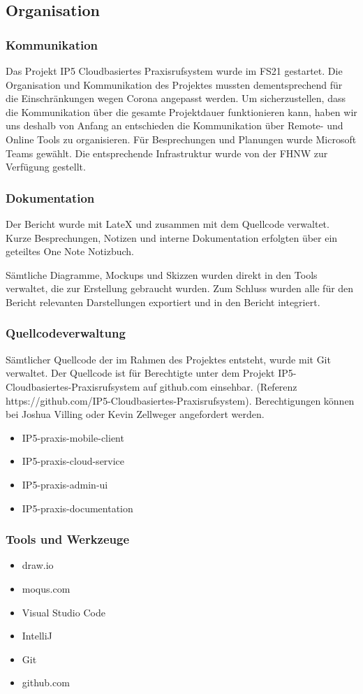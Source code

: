 \clearpage

\subsection{Organisation}\label{subsec:organisation}

\subsubsection*{Kommunikation}

Das Projekt IP5 Cloudbasiertes Praxisrufsystem wurde im FS21 gestartet. Die Organisation und Kommunikation des Projektes mussten dementsprechend für die Einschränkungen wegen Corona angepasst werden.
Um sicherzustellen, dass die Kommunikation über die gesamte Projektdauer funktionieren kann, haben wir uns deshalb von Anfang an entschieden die Kommunikation über Remote- und Online Tools zu organisieren.
Für Besprechungen und Planungen wurde Microsoft Teams gewählt. Die entsprechende Infrastruktur wurde von der FHNW zur Verfügung gestellt.

\subsubsection*{Dokumentation}

Der Bericht wurde mit LateX und zusammen mit dem Quellcode verwaltet. Kurze Besprechungen, Notizen und interne Dokumentation erfolgten über ein geteiltes One Note Notizbuch.

Sämtliche Diagramme, Mockups und Skizzen wurden direkt in den Tools verwaltet, die zur Erstellung gebraucht wurden. Zum Schluss wurden alle für den Bericht relevanten Darstellungen exportiert und in den Bericht integriert.

\subsubsection*{Quellcodeverwaltung}

Sämtlicher Quellcode der im Rahmen des Projektes entsteht, wurde mit Git verwaltet. Der Quellcode ist für Berechtigte unter dem Projekt IP5-Cloudbasiertes-Praxisrufsystem auf github.com einsehbar.
(Referenz https://github.com/IP5-Cloudbasiertes-Praxisrufsystem). Berechtigungen können bei Joshua Villing oder Kevin Zellweger angefordert werden.

\begin{itemize}
    \item IP5-praxis-mobile-client
    \item IP5-praxis-cloud-service
    \item IP5-praxis-admin-ui
    \item IP5-praxis-documentation
\end{itemize}

\subsubsection*{Tools und Werkzeuge}

\begin{itemize}
    \item draw.io
    \item moqus.com
    \item Visual Studio Code
    \item IntelliJ
    \item Git
    \item github.com
\end{itemize}
